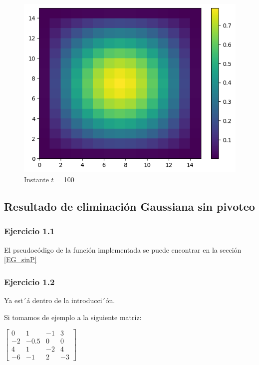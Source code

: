 \begin{figure}[H]
  \begin{minipage}[b]{0.5\linewidth}
    \centering
    \includegraphics[width=.5\linewidth]{./img/instante_100.png}
  \caption{Instante $t$ = 100}\label{instante100}
    \vspace{4ex}
  \end{minipage} 
\end{figure}






\iffalse
    \subsection{Resultado de eliminación Gaussiana sin pivoteo}
    \label{resultados EG}

    \subsubsection{Ejercicio 1.1}
    El pseudocódigo de la función implementada se puede encontrar en la sección \ref{EG_sinP}

    \subsubsection{Ejercicio 1.2}

    Ya est´á dentro de la introducci´ón.



    Si tomamos de ejemplo a la siguiente matriz:

    \begin{center}
    $\begin{bmatrix}
    0 & 1 & -1 & 3\\
    -2 & -0.5 & 0 & 0\\
    4 & 1 & -2 & 4\\
    -6 & -1 & 2 & -3
    \end{bmatrix}$
    \end{center}
                  
